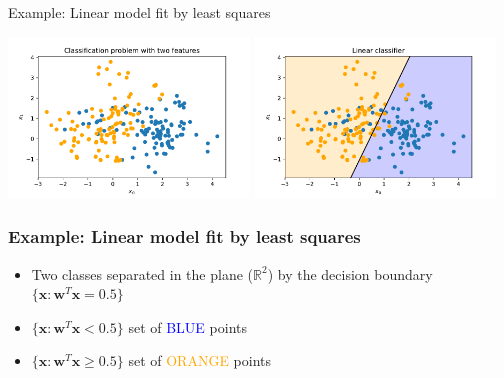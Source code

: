\documentclass[notes]{beamer}          %
\newcommand{\vect}[1]{\bm{#1}}
\newcommand{\field}[1]{\mathbb{#1}}
\newcommand{\R}{\field{R}}
\newif\iffull
\begin{document}
\begin{frame}{Example: Linear model fit by least squares}
    \begin{center}
        \includegraphics[width=0.48\textwidth]{../figures/week_1/classification_problem.pdf}
        \hfill
        \includegraphics[width=0.48\textwidth]{../figures/week_1/linear_model.pdf}
        \end{center}
\end{frame}

\iffull
\begin{frame}
\frametitle{Example: Linear model fit by least squares}
\begin{itemize}
    \item Two classes separated in the plane ($\R^2$) by the decision boundary $\{ \vect{x} : \vect{w}^T\vect{x} = 0.5 \}$
    \item $\{ \vect{x} : \vect{w}^T\vect{x} < 0.5 \}$ set of \textcolor{blue}{BLUE} points
    \item $\{ \vect{x} : \vect{w}^T\vect{x} \geq 0.5 \}$ set of \textcolor{orange}{ORANGE} points

\end{itemize}
\end{frame}
\end{document}
